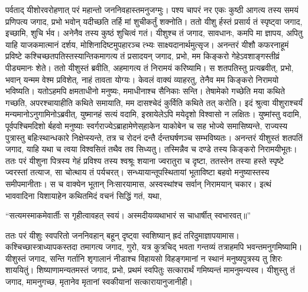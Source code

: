 \adhyAya
{}
\vakya पर्वताद् यीशोरवरोहणात् परं महान्तो जननिवहास्तमनुजग्मुः।
\vakya पश्य चापरं नर एकः कुष्ठी आगत्य तस्य समयं प्रणिपत्य जगाद, प्रभो भवोन् यदीच्छति तर्हि मां शुचीकर्तुं शक्नोति।
\vakya ततो यीशु र्हस्तं प्रसार्य तं स्पृष्ट्वा जगाद, इच्छामि, शुचि र्भव।
\vakya अनेनैव तस्य कुष्ठं शुचित्वं गतं। यीशुश्च तं जगाद, सावधानः, कमपि मा ज्ञापय, अपितु याहि याजकमात्मानं दर्शय, मोशिनादिष्टमुपहारञ्च त्भ्यः साक्ष्यदानार्थमुत्सृज।
\vakya अनन्तरं यीशौ कफरनाहूमं प्रविष्टे कश्चिच्छतपतिस्तस्यान्तिकमागत्य तं प्रसादयन् जगाद,
\vakya प्रभो, मम किङ्करो गेहेऽवशाङ्गस्तीव्रं पीड्यमानः शेते।
\vakya ततो यीशुस्तं ब्रवीति, अहमागत्य तं निरामयं करिष्यामि।
\vakya स शतपतिस्तु प्रत्यब्रवीत्, प्रभो, भवान् यन्मम वेश्म प्रविशेत्, नाहं तावता योग्यः। केवलं वाक्यं व्याहरतु, तेनैव मम किङ्करो निरामयो भविष्यति।
\vakya यतोऽहमपि क्षमताधीनो मनुष्यः, ममाधीनाश्च सैनिकाः सन्ति। तेषामेको गच्छेति मया कथिते गच्छति, अपरश्चायाहीति कथिते समायाति, मम दासश्चेदं कुर्विति कथिते तत् करोति।
\vakya इदं श्रुत्वा यीशुराश्चर्यं मन्यमानोऽनुगामिनोऽब्रवीत्, युष्मानहं सत्यं वदामि, इस्रायेलेऽपि मयेदृशो विश्वासो न लक्षितः।
\vakya युष्मांस्तु वदामि, पूर्वपश्चिमदिशो र्बहवो मनुष्याः स्वर्गराज्येऽब्राहामेणेस्‌हाकेन याकोबेन च सह भोज्ये समासिष्यन्ते,
\vakya राज्यस्य पुत्रास्तु बहिःस्थान्धकारे निक्षेप्स्यन्ते, तत्र च रोदनं दन्तै र्दन्तघर्षणञ्च सम्भविष्यतः।
\vakya अनन्तरं यीशुस्तं शतपतिं जगाद, याहि यथा च त्वया विश्वसितं तथैव तव सिध्यतु। तस्मिन्नैव च दण्डे तस्य किङ्करो निरामयीभूतः।
\vakya ततः परं यीशुना पित्रस्य गेहं प्रविश्य तस्य श्वश्रूः शयाना ज्वरातुरा च दृष्टा,
\vakya ततस्तेन तस्या हस्ते स्पृष्टे ज्वरस्तां तत्याज, सा चोत्थाय तं पर्यचरत्।
\vakya सन्ध्यायान्तूपस्थितायां भूताविष्टा बहवो मनुष्यास्तस्य समीपमानीताः। स च वाक्येन भूतान् निःसारयामास, अस्वस्थांश्च सर्वान् निरामयान् चकार।
\vakya इत्थं भाववादिना यिशायाहेन कथितमिदं वचनं सिद्धिं गतं, यथा,
\begin{poem}
\startwithline “सत्यमस्माकमेवार्तीः स गृहीत्वावहत् स्वयं।
\pline अस्मदीयव्यथाभारं स चाधार्षीत् स्वभारवत्॥”
\end{poem}
\vakya ततः परं यीशुः स्वपरितो जननिवहान् बहून् दृष्ट्वा स्वशिष्यान् ह्रदं तरिदुमाज्ञापयामास।
\vakya कश्चिच्छास्त्राध्यापकस्तदा तमागत्य जगाद, गुरो, यत्र कुत्रचिद् भवता गन्तव्यं तत्राहमपि भवन्तमनुगमिष्यामि।
\vakya यीशुस्तं जगाद, सन्ति गर्तानि शृगालानं नीडाश्च विहायसो विहङ्गमानां न स्थानं मनुष्यपुत्रस्य तु शिरः शाययितुं।
\vakya शिष्याणामन्यतमस्तं जगाद, प्रभो, प्रथमं स्वपितुः सत्कारार्थं गमिष्यन्तं मामनुमन्यस्व।
\vakya यीशुस्तु तं जगाद, मामनुगच्छ, मृतानेव मृतानां स्वकीयानां सत्कारायानुजानीही।

